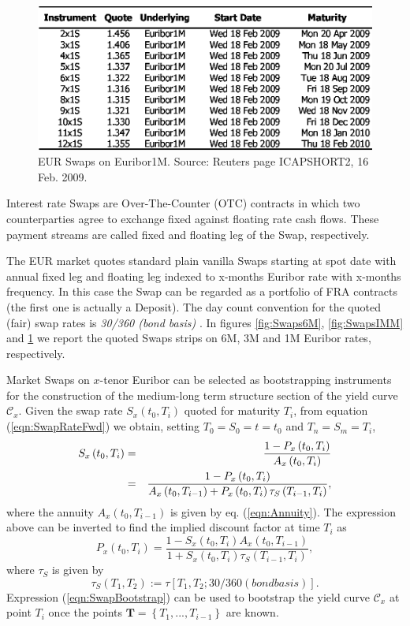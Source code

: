 \documentclass[11pt,reqno]{amsart}
\begin{document}
\begin{figure}[tbp]
\centering
\includegraphics[scale=0.9]{./FigMktSwaps1M}
\caption{EUR Swaps on Euribor1M. Source: Reuters page ICAPSHORT2, 16 Feb. 2009.}
\label{fig:Swaps1M}
\end{figure}

Interest rate Swaps are Over-The-Counter (OTC) contracts in which two counterparties agree to exchange fixed against floating rate cash flows. These payment streams are called fixed and floating leg of the Swap, respectively.
\par
The EUR market quotes standard plain vanilla Swaps starting at spot date with annual fixed leg and floating leg indexed to x-months Euribor rate with x-months frequency. In this case the Swap can be regarded as a portfolio of FRA contracts (the first one is actually a Deposit). The day count convention for the quoted (fair) swap rates is \emph{30/360 (bond basis)} \cite{ISDA}.
In figures \ref{fig:Swaps6M}, \ref{fig:SwapsIMM} and \ref{fig:Swaps1M} we report the quoted Swaps strips on 6M, 3M and 1M Euribor rates, respectively.
\par
Market Swaps on $x$-tenor Euribor can be selected as bootstrapping instruments for the construction of the medium-long term structure section of the yield curve $\mathcal{C}_x$.
Given the swap rate $S_x\left(t_0,T_i\right)$ quoted for maturity $T_i$, from equation (\ref{eqn:SwapRateFwd}) we obtain, setting $T_0=S_0=t=t_0$ and $T_n=S_m=T_i$,
\begin{eqnarray}
S_x\left(t_0,T_i\right)
&=& \frac{1 - P_x\left(t_0,T_i\right)}
         {A_x\left(t_0,T_i\right)} \notag\\
&=& \frac{1 - P_x\left(t_0,T_i\right)}
         {A_x\left(t_0,T_{i-1}\right)+P_x\left(t_0,T_i\right)\tau_S\left(T_{i-1},T_i\right)},
\label{eqn:SwapRateMkt}
\end{eqnarray}
where the annuity $A_x\left(t_0,T_{i-1}\right)$ is given by eq. (\ref{eqn:Annuity}).
The expression above can be inverted to find the implied discount factor at time $T_i$ as
\begin{equation}
P_x\left(t_0,T_i\right)
=   \frac{1-S_x\left(t_0,T_i\right)A_x\left(t_0,T_{i-1}\right)}
         {1+S_x\left(t_0,T_i\right)\tau_S\left(T_{i-1},T_i\right)},
\label{eqn:SwapBootstrap}
\end{equation}
where $\tau_S$ is given by
\begin{equation}
\tau_S\left(T_1,T_2\right) := \tau\left[T_1,T_2;30/360 (bond basis)\right].
\end{equation}
Expression (\ref{eqn:SwapBootstrap}) can be used to bootstrap the yield curve $\mathcal{C}_x$ at point $T_i$ once the points $\mathbf{T=}\left\{T_1,...,T_{i-1}\right\}$ are known.
\end{document}
